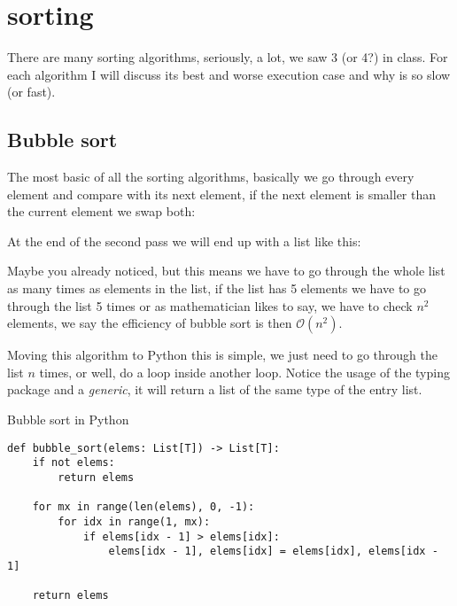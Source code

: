 \documentclass[main.tex]{subfiles}
\begin{document}
\section{sorting}

There are many sorting algorithms, seriously, a lot, we saw 3 (or 4?) in class. For each algorithm I will discuss its best and worse execution case and why is so slow (or fast).

\subsection{Bubble sort}

The most basic of all the sorting algorithms, basically we go through every element and compare with its next element, if the next element is smaller than the current element we swap both:



At the end of the second pass we will end up with a list like this:

\begin{figure}[htp]
    \centering
\end{figure}

Maybe you already noticed, but this means we have to go through the whole list as many times as elements in the list, if the list has 5 elements we have to go through the list 5 times or as mathematician likes to say, we have to check $n^2$ elements, we say the efficiency of bubble sort is then $\mathcal{O}(n^2)$.

Moving this algorithm to Python this is simple, we just need to go through the list $n$ times, or well, do a loop inside another loop. Notice the usage of the typing package and a \textit{generic}, it will return a list of the same type of the entry list.

\begin{listing}
\caption{Bubble sort in Python}
\begin{verbatim}
def bubble_sort(elems: List[T]) -> List[T]:
    if not elems:
        return elems
    
    for mx in range(len(elems), 0, -1):
        for idx in range(1, mx):
            if elems[idx - 1] > elems[idx]:
                elems[idx - 1], elems[idx] = elems[idx], elems[idx - 1]

    return elems
\end{verbatim}
\end{listing}
\end{document}
